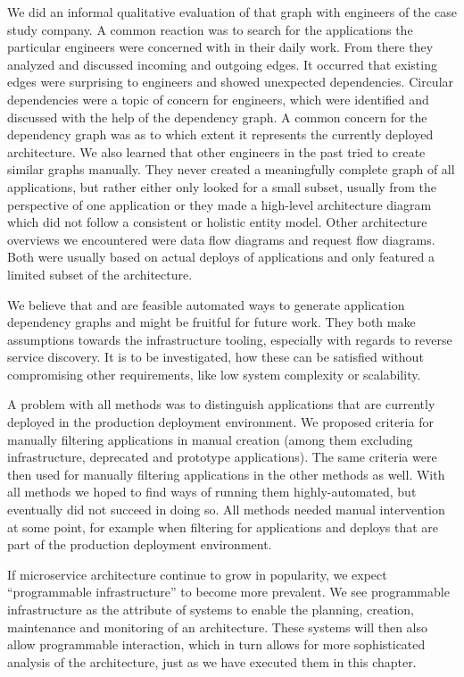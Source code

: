 We did an informal qualitative evaluation of that graph with engineers of the case study company. A common reaction was to search for the applications the particular engineers were concerned with in their daily work. From there they analyzed and discussed incoming and outgoing edges. It occurred that existing edges were surprising to engineers and showed unexpected dependencies. Circular dependencies were a topic of concern for engineers, which were identified and discussed with the help of the dependency graph. A common concern for the dependency graph was as to which extent it represents the currently deployed architecture. We also learned that other engineers in the past tried to create similar graphs manually. They never created a meaningfully complete graph of all applications, but rather either only looked for a small subset, usually from the perspective of one application or they made a high-level architecture diagram which did not follow a consistent or holistic entity model. Other architecture overviews we encountered were data flow diagrams and request flow diagrams. Both were usually based on actual deploys of applications and only featured a limited subset of the architecture.

We believe that  and  are feasible automated ways to generate application dependency graphs and might be fruitful for future work. They both make assumptions towards the infrastructure tooling, especially with regards to reverse service discovery. It is to be investigated, how these can be satisfied without compromising other requirements, like low system complexity or scalability.

A problem with all methods was to distinguish applications that are currently deployed in the production deployment environment. We proposed criteria for manually filtering applications in manual creation (among them excluding infrastructure, deprecated and prototype applications). The same criteria were then used for manually filtering applications in the other methods as well. With all methods we hoped to find ways of running them highly-automated, but eventually did not succeed in doing so. All methods needed manual intervention at some point, for example when filtering for applications and deploys that are part of the production deployment environment.

If microservice architecture continue to grow in popularity, we expect ``programmable infrastructure'' to become more prevalent. We see programmable infrastructure as the attribute of systems to enable the planning, creation, maintenance and monitoring of an architecture. These systems will then also allow programmable interaction, which in turn allows for more sophisticated analysis of the architecture, just as we have executed them in this chapter.

